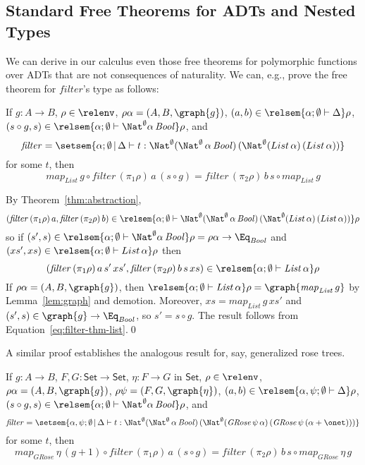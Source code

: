 \documentclass{lmcs}
\theoremstyle{plain}\newtheorem{satz}[thm]{Satz}
\newcommand{\set}{\mathsf{Set}}
\newcommand{\semmap}{\mathit{map}}
\newcommand{\filtype}{\Nat^\emptyset 
 (\Nat^\emptyset \, \alpha \, \mathit{Bool})\, (\Nat^\emptyset 
  (List \, \alpha) \, (List \, \alpha))}
\newcommand{\filtypeGRose}{\Nat^\emptyset 
 (\Nat^\emptyset \, \alpha \, \mathit{Bool})\, (\Nat^\emptyset 
  (\mathit{GRose}\,\psi \, \alpha) \, (\mathit{GRose}\,\psi \, (\alpha
  + \onet)))}
\begin{document}
\subsection{Standard Free Theorems for ADTs and Nested
  Types}\label{sec:ft-adt} 

We can derive in our calculus even those free theorems for polymorphic
functions over ADTs that are not consequences of naturality.  We can,
e.g., prove the free theorem for $\mathit{filter}$'s type as follows:

\begin{thm} 
If $g : A \to B$, $\rho \in \relenv$, $\rho \alpha = (A, B, \graph{g})$,
$(a, b) \in \relsem{\alpha ;\emptyset \vdash \Delta} \rho$, $(s \circ
g, s) \in \relsem{\alpha; \emptyset \vdash \Nat^\emptyset \alpha \,
  \mathit{Bool}} \rho$, and
\[\mathit{filter} = \setsem{\alpha; \emptyset \,|\, \Delta \vdash t :
  \filtype}\]
\noindent
for some $t$, then
\[  \mathit{map}_{\mathit{List}} \,g \circ \mathit{filter} \, (\pi_1
\rho) \, a \, (s \circ g) = \mathit{filter}\, (\pi_2\rho) \, b \, s
\circ \mathit{map}_{\mathit{List}} \,g\]
\end{thm}
\proof
By Theorem~\ref{thm:abstraction}, \[(\mathit{filter}\, (\pi_1 \rho)\,
a, \mathit{filter}\, (\pi_2 \rho)\, b) \in \relsem{\alpha; \emptyset
  \vdash \filtype} \rho\] so if $(s', s) \in \relsem{\alpha; \emptyset
  \vdash \Nat^\emptyset \alpha \, \mathit{Bool}} \rho = \rho\alpha \to
\Eq_{\mathit{Bool}}$ and $(xs', xs) \in \relsem{\alpha; \emptyset
  \vdash List \, \alpha} \rho$ then
\begin{equation}\label{eq:filter-thm-list}
  (\mathit{filter}\, (\pi_1\rho) \,a \,s' \,xs', \mathit{filter} \,
  (\pi_2\rho) \,b \,s \,xs) \in \relsem{\alpha; \emptyset \vdash
    \mathit{List} \, \alpha} \rho
\end{equation}
If $\rho\alpha = (A, B, \graph{g})$, then $\relsem{\alpha; \emptyset
  \vdash \mathit{List} \, \alpha} \rho =
\graph{\mathit{map}_{\mathit{List}} \, g}$ by Lemma~\ref{lem:graph}
and demotion.  Moreover, $xs =
\mathit{map}_{\mathit{List}} \,g \,xs'$ and $(s', s) \in \graph{g} \to
\Eq_{\mathit{Bool}}$, so $s' = s \circ g$. The result
follows from 
Equation~\ref{eq:filter-thm-list}.\qed

A similar proof establishes the analogous result for, say, generalized
rose trees. 
\begin{thm} 
  If $g : A \to B$,
$F, G : \set \to \set$,
  $\eta : F \to G$ in $\set$, $\rho \in \relenv$, $\rho \alpha =
 (A, B, \graph{g})$, $\rho \psi = (F, G, \graph{\eta})$, $(a, b) \in
 \relsem{\alpha, \psi ;\emptyset \vdash \Delta} \rho$, $(s \circ
 g, s) \in \relsem{\alpha; \emptyset \vdash \Nat^\emptyset \alpha \,
   \mathit{Bool}} \rho$, and
 \[ \mathit{filter} = \setsem{\alpha, \psi; \emptyset \,|\, \Delta
      \vdash t : \filtypeGRose}  \]
for some $t$, then
\[ \semmap_{\mathit{GRose}}\, \eta\, (g + 1) \circ \mathit{filter} \,
(\pi_1 \rho) \, a \, (s \circ g) = \mathit{filter} \, (\pi_2\rho) \, b
\, s \circ 
\semmap_{\mathit{GRose}}\, \eta\, g\]
\end{thm}
\end{document}
